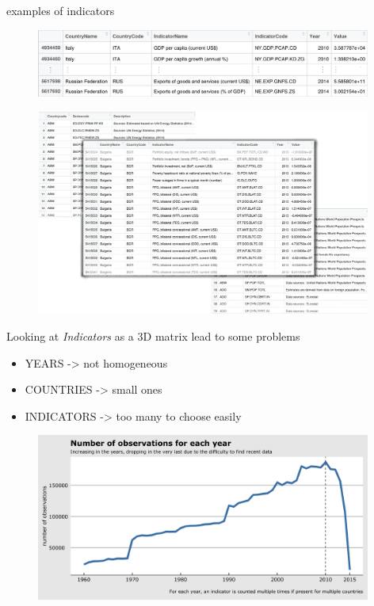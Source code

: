 \documentclass{beamer}
\begin{document}
\begin{frame}{examples of indicators}
	\begin{figure}
		\centering
		\includegraphics [width=11cm]{indicators.png}
		
	\end{figure}
\end{frame}


\begin{frame}
	\begin{figure}
		\centering
		\includegraphics[width=11cm]{tables_2.png}
	\end{figure}
\end{frame}

\begin{frame}
	Looking at \textit{Indicators} as a 3D matrix lead to some problems
	\begin{itemize}
		\item YEARS -> not homogeneous
		\item COUNTRIES -> small ones
		\item INDICATORS -> too many to choose easily
	\end{itemize}
\end{frame}

\begin{frame}
	\begin{figure}
		\centering
		\includegraphics[width=11cm]{plot0001.png}
	\end{figure}
\end{frame}
\end{document}
